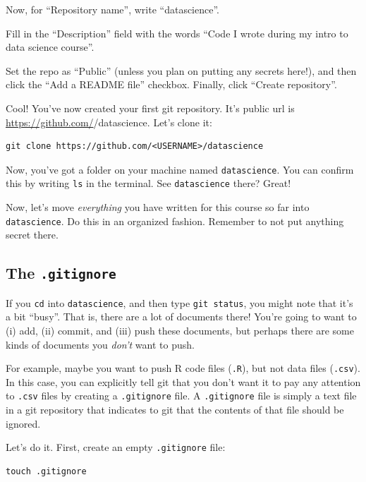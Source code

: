 \documentclass[
]{book}
\begin{document}
Now, for ``Repository name'', write ``datascience''.

Fill in the ``Description'' field with the words ``Code I wrote during my intro to data science course''.

Set the repo as ``Public'' (unless you plan on putting any secrets here!), and then click the ``Add a README file'' checkbox. Finally, click ``Create repository''.

Cool! You've now created your first git repository. It's public url is \url{https://github.com/}/datascience. Let's clone it:

\begin{verbatim}
git clone https://github.com/<USERNAME>/datascience
\end{verbatim}

Now, you've got a folder on your machine named \texttt{datascience}. You can confirm this by writing \texttt{ls} in the terminal.
See \texttt{datascience} there? Great!

Now, let's move \emph{everything} you have written for this course so far into \texttt{datascience}. Do this in an organized fashion. Remember to not put anything secret there.

\hypertarget{the-.gitignore}{%
\subsection*{\texorpdfstring{The \texttt{.gitignore}}{The .gitignore}}\label{the-.gitignore}}

If you \texttt{cd} into \texttt{datascience}, and then type \texttt{git\ status}, you might note that it's a bit ``busy''. That is, there are a lot of documents there! You're going to want to (i) add, (ii) commit, and (iii) push these documents, but perhaps there are some kinds of documents you \emph{don't} want to push.

For example, maybe you want to push R code files (\texttt{.R}), but not data files (\texttt{.csv}). In this case, you can explicitly tell git that you don't want it to pay any attention to \texttt{.csv} files by creating a \texttt{.gitignore} file. A \texttt{.gitignore} file is simply a text file in a git repository that indicates to git that the contents of that file should be ignored.

Let's do it. First, create an empty \texttt{.gitignore} file:

\begin{verbatim}
touch .gitignore
\end{verbatim}
\end{document}
